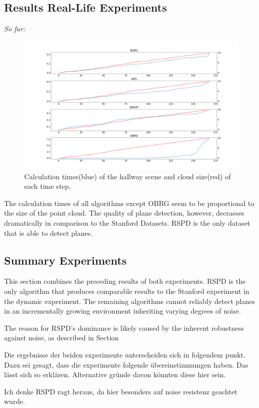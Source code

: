 \documentclass[main.tex]{subfiles}
\begin{document}
\subsection{Results Real-Life Experiments}
\textit{So far:}

\begin{figure}[]
    \centering
    \includegraphics[width=\textwidth]{images/dyn_time-hallway.png}
    \caption[Time Results Hallway]{Calculation times(blue) of the hallway scene and cloud size(red) of each time step.}
    \label{fig:dynhallway}
\end{figure}

The calculation times of all algorithms except OBRG seem to be proportional to the size of the point cloud.
The quality of plane detection, however, decraeses dramatically in comparison to the Stanford Datasets. RSPD is the only dataset that
is able to detect planes. %


\subsection*{Summary Experiments}
This section combines the preceding results of both experiments.
RSPD is the only algorithm that produces comparable results to the Stanford experiment in the dynamic experiment.
The remaining algorithms cannot reliably detect planes in an incrementally growing environment inheriting varying degrees of noise.

The reason for RSPD's dominance is likely caused by the inherent robustness against noise, as described in Section~

Die ergebnisse der beiden experimente unterscheiden sich in folgendem punkt. Dazu sei gesagt, dass die experimente folgende übereinstimmungen haben.
Das lässt sich so erklären. Alternative gründe davon könnten diese hier sein.

Ich denke RSPD ragt heraus, da hier besonders auf noise resistenz geachtet wurde. %
\end{document}
